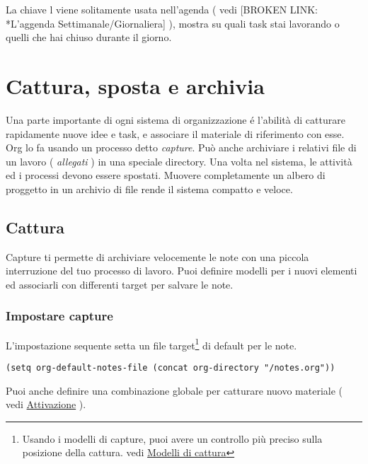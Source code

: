 \documentclass[11pt]{article}
\begin{document}
La chiave l viene solitamente usata nell'agenda ( vedi
[BROKEN LINK: *L'aggenda Settimanale/Giornaliera] ), mostra su quali task stai
lavorando o quelli che hai chiuso durante il giorno.

\section{Cattura, sposta e archivia}
\label{sec:org15f3948}
Una parte importante di ogni sistema di organizzazione é l'abilità di
catturare rapidamente nuove idee e task, e associare il materiale di
riferimento con esse. Org lo fa usando un processo detto
\emph{capture}. Può anche archiviare i relativi file di un lavoro (
\emph{allegati} ) in una speciale directory. Una volta nel sistema, le
attività ed i processi devono essere spostati. Muovere completamente
un albero di proggetto in un archivio di file rende il sistema
compatto e veloce.

\subsection{Cattura}
\label{sec:org1358116}
Capture ti permette di archiviare velocemente le note con una piccola
interruzione del tuo processo di lavoro. Puoi definire modelli per i
nuovi elementi ed associarli con differenti target per salvare le
note.

\subsubsection*{Impostare capture}
\label{sec:org8936a99}
L'impostazione sequente setta un file target\footnote{Usando i modelli di capture, puoi avere un controllo più preciso
sulla posizione della cattura. vedi \hyperref[sec:org14346c5]{Modelli di cattura}} di default per le
note.

\begin{verbatim}
(setq org-default-notes-file (concat org-directory "/notes.org"))
\end{verbatim}

Puoi anche definire una combinazione globale per catturare nuovo
materiale ( vedi \hyperref[sec:org316fc0b]{Attivazione} ).
\end{document}
